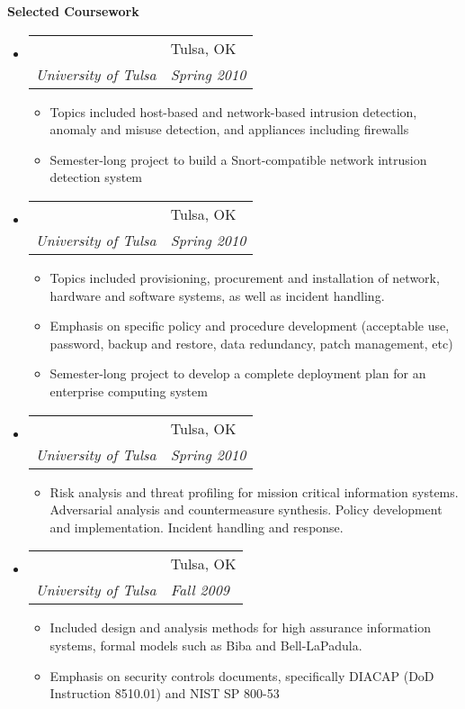 \documentclass[letterpaper,11pt]{article}
\makeatletter
\newcommand{\resitem}[1]{\item \parbox[t]{4.6in}{#1} \vspace{-2pt}}
\newcommand{\resheading}[1]{{\large \colorbox{mygrey}{\begin{minipage}{\textwidth}{\textbf{#1 \vphantom{p\^{E}}}}\end{minipage}}}}
\newcommand{\ressubheading}[4]{
\begin{tabular*}{6.5in}[t]{l@{\extracolsep{\fill}}l}
		\textbf{\parbox[t]{4.5in}{\raggedright #1 }} & \parbox[b]{1.5in}{#2} \\
		\textit{#3} & \textit{#4} \\
\end{tabular*}\vspace{-6pt}}
\makeatother
\begin{document}
\resheading{Selected Coursework}
\begin{itemize}

\item
	\ressubheading{Network Security}{Tulsa, OK}{University of Tulsa}{Spring 2010}
	\begin{itemize}
		\resitem{Topics included host-based and network-based intrusion detection, anomaly and misuse detection, and appliances including firewalls}
		\resitem{Semester-long project to build a Snort-compatible network intrusion detection system}
	\end{itemize}
\item
	\ressubheading{Secure System Administration}{Tulsa, OK}{University of Tulsa}{Spring 2010}
	\begin{itemize}
		\resitem{Topics included provisioning, procurement and installation of network, hardware and software systems, as well as incident handling.}
		\resitem{Emphasis on specific policy and procedure development (acceptable use, password, backup and restore, data redundancy, patch management, etc)}
		\resitem{Semester-long project to develop a complete deployment plan for an enterprise computing system}
	\end{itemize}
\item
	\ressubheading{Risk Management for Information Systems}{Tulsa, OK}{University of Tulsa}{Spring 2010}
	\begin{itemize}
		\resitem{Risk analysis and threat profiling for mission critical information systems. Adversarial analysis and countermeasure synthesis. Policy development and implementation. Incident handling and response.}
	\end{itemize}
\item
	\ressubheading{Information Systems Assurance}{Tulsa, OK}{University of Tulsa}{Fall 2009}
	\begin{itemize}
		\resitem{Included design and analysis methods for high assurance information systems, formal models such as Biba and Bell-LaPadula.}
		\resitem{Emphasis on security controls documents, specifically DIACAP (DoD Instruction 8510.01) and NIST SP 800-53}

\end{itemize}
\end{itemize}
\end{document}
